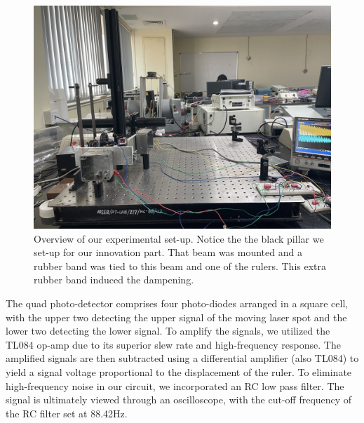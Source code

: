 \begin{figure}[H]
	\centering
	\includegraphics[scale=0.3]{setup.jpeg}
	\caption{Overview of our experimental set-up. Notice the the black pillar we set-up for our innovation part. That beam was mounted and a rubber band was tied to this beam and one of the rulers. This extra rubber band induced the dampening.}
	\label{fig:mb-fe-0}
\end{figure}
The quad photo-detector comprises four photo-diodes arranged in a square cell, with the upper two detecting the upper signal of the moving laser spot and the lower two detecting the lower signal. To amplify the signals, we utilized the TL084 op-amp due to its superior slew rate and high-frequency response. The amplified signals are then subtracted using a differential amplifier (also TL084) to yield a signal voltage proportional to the displacement of the ruler. To eliminate high-frequency noise in our circuit, we incorporated an RC low pass filter. The signal is ultimately viewed through an oscilloscope, with the cut-off frequency of the RC filter set at 88.42Hz.
